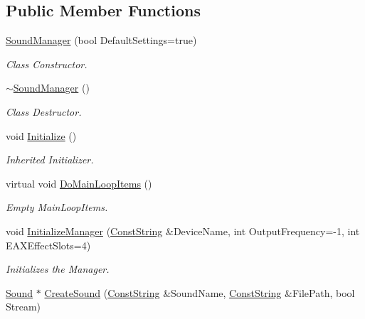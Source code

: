 \subsection*{Public Member Functions}
\begin{DoxyCompactItemize}
\item 
\hyperlink{classphys_1_1SoundManager_a42d41090652f8ef12d575d78881d6a05}{SoundManager} (bool DefaultSettings=true)
\begin{DoxyCompactList}\small\item\em Class Constructor. \item\end{DoxyCompactList}\item 
\hyperlink{classphys_1_1SoundManager_af557110e5f0eccc7be861f163e1670d0}{$\sim$SoundManager} ()
\begin{DoxyCompactList}\small\item\em Class Destructor. \item\end{DoxyCompactList}\item 
void \hyperlink{classphys_1_1SoundManager_ae6d3957f965b54e06ec540e903cec68d}{Initialize} ()
\begin{DoxyCompactList}\small\item\em Inherited Initializer. \item\end{DoxyCompactList}\item 
virtual void \hyperlink{classphys_1_1SoundManager_a577b228753ea19856b8476ab831e547e}{DoMainLoopItems} ()
\begin{DoxyCompactList}\small\item\em Empty MainLoopItems. \item\end{DoxyCompactList}\item 
void \hyperlink{classphys_1_1SoundManager_a735ca3ad1554d70623ac60f38ca4cefc}{InitializeManager} (\hyperlink{namespacephys_a5ce5049f8b4bf88d6413c47b504ebb31}{ConstString} \&DeviceName, int OutputFrequency=-\/1, int EAXEffectSlots=4)
\begin{DoxyCompactList}\small\item\em Initializes the Manager. \item\end{DoxyCompactList}\item 
\hyperlink{classphys_1_1Sound}{Sound} $\ast$ \hyperlink{classphys_1_1SoundManager_a4504934e7a6a75045f0a8d303b7be0b8}{CreateSound} (\hyperlink{namespacephys_a5ce5049f8b4bf88d6413c47b504ebb31}{ConstString} \&SoundName, \hyperlink{namespacephys_a5ce5049f8b4bf88d6413c47b504ebb31}{ConstString} \&FilePath, bool Stream)

\end{DoxyCompactItemize}
